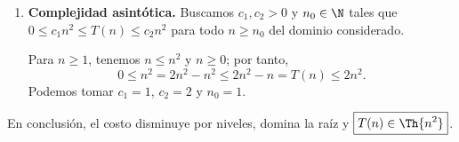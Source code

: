 \begin{enumerate}
\textit{Caso base:} para $n=1$, $2(1)^2-1=1=T(1)$.

\textit{Paso inductivo:} para $n=2^h$ con $h\ge1$, suponemos
$T(n/2)=2(n/2)^2-n/2$. Al sustituir en la recurrencia:
\[
\begin{aligned}
T(n)
&=2T(n/2)+n^2\\
&=2\left[2\left(\frac n2\right)^2-\frac n2\right]+n^2\\
&=2\left(\frac{n^2}{2}-\frac n2\right)+n^2\\
&=n^2-n+n^2=2n^2-n.
\end{aligned}
\]
La fórmula satisface tanto la recurrencia como el caso base.

\item \textbf{Complejidad asintótica.} Buscamos $c_1,c_2>0$ y $n_0\in\N$ tales que $0\le c_1n^2\le T(n)\le c_2n^2$ para todo $n\ge n_0$ del dominio considerado.

Para $n\ge1$, tenemos $n\le n^2$ y $n\ge0$; por tanto,
\[
0\le n^2=2n^2-n^2\le 2n^2-n=T(n)\le2n^2.
\]
Podemos tomar $c_1=1$, $c_2=2$ y $n_0=1$.
\end{enumerate}

En conclusión, el costo disminuye por niveles, domina la raíz y $\boxed{T(n)\in\Th{n^2}}$.
\fin
